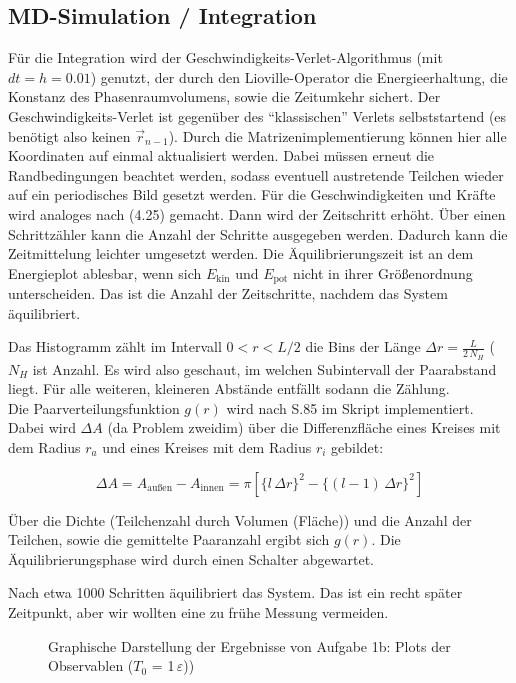 \subsection*{MD-Simulation / Integration}
Für die Integration wird der Geschwindigkeits-Verlet-Algorithmus (mit $dt=h=0.01$) genutzt, der durch den Lioville-Operator die Energieerhaltung, die Konstanz des Phasenraumvolumens, sowie die Zeitumkehr sichert. Der Geschwindigkeits-Verlet ist gegenüber des \enquote{klassischen} Verlets selbststartend (es benötigt also keinen $\vec{r}_{n-1}$). Durch die Matrizenimplementierung können hier alle Koordinaten auf einmal aktualisiert werden. Dabei müssen erneut die Randbedingungen beachtet werden, sodass eventuell austretende Teilchen wieder auf ein periodisches Bild gesetzt werden. Für die Geschwindigkeiten und Kräfte wird analoges nach (4.25) gemacht. Dann wird der Zeitschritt erhöht. Über einen Schrittzähler kann die Anzahl der Schritte ausgegeben werden. Dadurch kann die Zeitmittelung leichter umgesetzt werden. Die Äquilibrierungszeit ist an dem Energieplot ablesbar, wenn sich $E_{\text{kin}}$ und $E_{\text{pot}}$ nicht in ihrer Größenordnung unterscheiden. Das ist die Anzahl der Zeitschritte, nachdem das System äquilibriert.

Das Histogramm zählt im Intervall $0<r<L/2$ die Bins der Länge $\Delta r = \frac{L}{2\,N_H}$ ($N_H$ ist Anzahl. Es wird also geschaut, im welchen Subintervall der Paarabstand liegt. Für alle weiteren, kleineren Abstände entfällt sodann die Zählung.\\

Die Paarverteilungsfunktion $g(r)$ wird nach S.85 im Skript implementiert. Dabei wird $\Delta A$ (da Problem zweidim) über die Differenzfläche eines Kreises mit dem Radius $r_a$ und eines Kreises mit dem Radius $r_i$ gebildet:

\begin{equation*}
\Delta A = A_{\text{außen}} - A_{\text{innen}} = \pi [\{l \, \Delta r\}^2-\{(l-1)\,\Delta r\}^2]
\end{equation*}

Über die Dichte (Teilchenzahl durch Volumen (Fläche)) und die Anzahl der Teilchen, sowie die gemittelte Paaranzahl ergibt sich $g(r)$. Die Äquilibrierungsphase wird durch einen Schalter abgewartet.

Nach etwa 1000 Schritten äquilibriert das System. Das ist ein recht später Zeitpunkt, aber wir wollten eine zu frühe Messung vermeiden.

\begin{landscape}
	\begin{figure}
		\caption{Graphische Darstellung der Ergebnisse von Aufgabe 1b: Plots der Observablen ($T_0$ = 1$\,\varepsilon$))}
		\label{fig:observablen1}
	\end{figure}
\end{landscape} 


